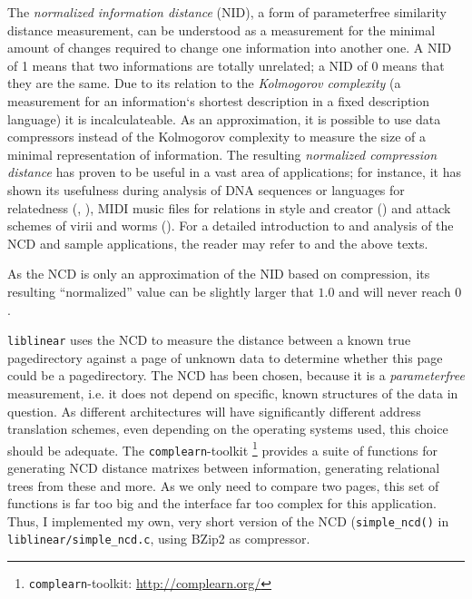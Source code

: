 The \emph{normalized information distance} (NID), a form of parameterfree
similarity distance measurement, can be understood as a measurement for the
minimal amount of changes required to change one information into another one.
A NID of 1 means that two informations are totally unrelated; a NID of 0 means
that they are the same.  Due to its relation to the \emph{Kolmogorov complexity}
(a measurement for an information`s shortest description in a fixed description
language) it is incalculateable.  As an approximation, it is possible to use
data compressors instead of the Kolmogorov complexity to measure the size of a
minimal representation of information. The resulting \emph{normalized
compression distance} has proven to be useful in a vast area of applications;
for instance, it has shown its usefulness during analysis of DNA sequences or
languages for relatedness (\cite{clustering_by_compression:2005},
\cite{similarity_matrix:2004}), MIDI music files for relations in style and
creator (\cite{clustering_by_compression:2005}) and attack schemes of virii and
worms (\cite{analysing_worms_with_ncd:2006}).  For a detailed introduction to
and analysis of the NCD and sample applications, the reader may refer to
\cite{kolmogorov:1997} and the above texts.

As the NCD is only an approximation of the NID based on compression, its
resulting ``normalized'' value can be slightly larger that $1.0$ and will never
reach $0$.

\texttt{liblinear} uses the NCD to measure the distance between a known true
pagedirectory against a page of unknown data to determine whether this page
could be a pagedirectory. The NCD has been chosen, because it is a
\emph{parameterfree} measurement, i.e. it does not depend on specific, known
structures of the data in question. As different architectures will have
significantly different address translation schemes, even depending on the
operating systems used, this choice should be adequate. The
\texttt{complearn}-toolkit \footnote{\texttt{complearn}-toolkit:
\href{http://complearn.org/}{http://complearn.org/}} provides a suite of
functions for generating NCD distance matrixes between information, generating
relational trees from these and more.  As we only need to compare two pages,
this set of functions is far too big and the interface far too complex for this
application.  Thus, I implemented my own, very short version of the NCD
(\texttt{simple\_ncd()} in \texttt{liblinear/simple\_ncd.c}, using BZip2 as
compressor.


